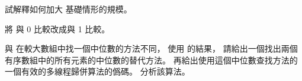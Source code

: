 \startsection[
  title={Multithreaded merge sort},
]

\startEXERCISE
試解釋如何加大  基礎情形的規模。
\stopEXERCISE

\startANSWER
將  與 0 比較改成與 1 比較。
\stopANSWER

\startEXERCISE
與  在較大數組中找一個中位數的方法不同，
使用 的結果，
請給出一個找出兩個有序數組中的所有元素的中位數的替代方法。
再給出使用這個中位數查找方法的一個有效的多線程歸併算法的僞碼。
分析該算法。
\stopEXERCISE

\startANSWER
\stopANSWER

\stopsection

